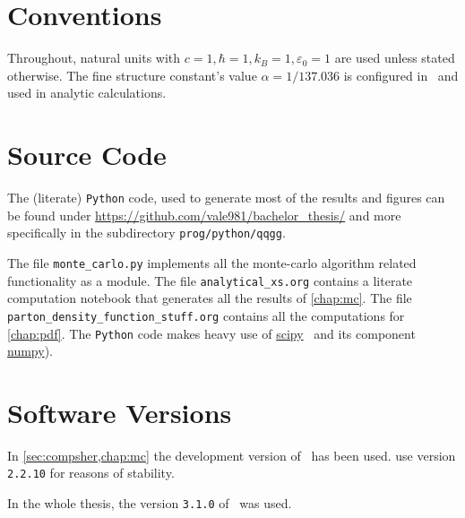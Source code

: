\section{Conventions}%
\label{sec:convent}

Throughout, natural units with
\(c=1, \hbar = 1, k_B=1, \varepsilon_0 = 1\) are used unless stated
otherwise. The fine structure constant's value \(\alpha = 1/137.036\)
is configured in \sherpa\ and used in analytic calculations.

\section{Source Code}%
\label{sec:source}

The (literate) \texttt{Python} code, used to generate most of the
results and figures can be found under
\url{https://github.com/vale981/bachelor_thesis/} and more
specifically in the subdirectory \texttt{prog/python/qqgg}.

The file \texttt{monte\_carlo.py} implements all the monte-carlo
algorithm related functionality as a module. The file
\texttt{analytical\_xs.org} contains a literate computation notebook
that generates all the results of \cref{chap:mc}. The file
\texttt{parton\_density\_function\_stuff.org} contains all the
computations for \cref{chap:pdf}. The \texttt{Python} code makes heavy
use of \href{https://www.scipy.org/}{scipy}~\cite{2020Virtanen:Sc} and
its component \href{https://numpy.org/}{numpy}).

\section{Software Versions}%
\label{sec:versions}

In \cref{sec:compsher,chap:mc} the development version of \sherpa\ has
been used.  use version \texttt{2.2.10} for
reasons of stability.

In the whole thesis, the version \texttt{3.1.0} of \rivet\ was used.

